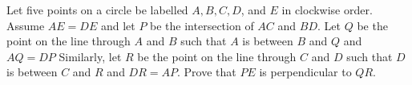 Let five points on a circle be labelled $A, B, C, D$,  and $E$ in clockwise order. Assume $AE = DE$ and let $P$ be the intersection of $AC$ and $BD$. Let $Q$ be the point on the line through $A$ and $B$ such that $A$ is between $B$ and $Q$ and $AQ = DP$ Similarly, let $R$ be the point on the line through $C$ and $D$ such that $D$ is between $C$ and $R$ and $DR = AP$. Prove that $PE$ is perpendicular to $QR$.